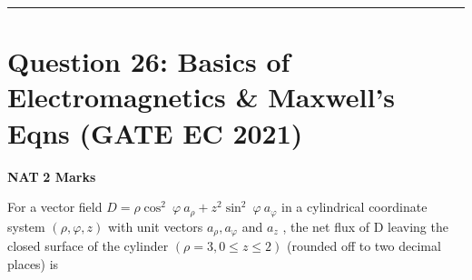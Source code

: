 \documentclass[11pt,a4paper]{article}
\begin{document}
\vspace{1.5em}
\hrule
\vspace{1.5em}

\section*{Question 26: Basics of Electromagnetics \& Maxwell's Eqns (GATE EC 2021)}
\noindent \textbf{\color{primary}NAT} \hfill \textbf{\color{secondary}2 Marks}


\noindent For a vector field $D=\rho\cos^{2}\:\varphi \:a_{\rho }+z^{2}\sin^{2}\:\varphi \:a_{\varphi }$
in a cylindrical coordinate system $\left ( \rho ,\varphi ,z \right )$
with unit vectors $a_{\rho },a_{\varphi }$
and $a_{z}$
, the net flux of D leaving the closed surface of the cylinder $\left ( \rho =3, 0\leq z\leq 2 \right )$
(rounded off to two decimal places) is \underline{\hspace{1.5cm}}
\end{document}
